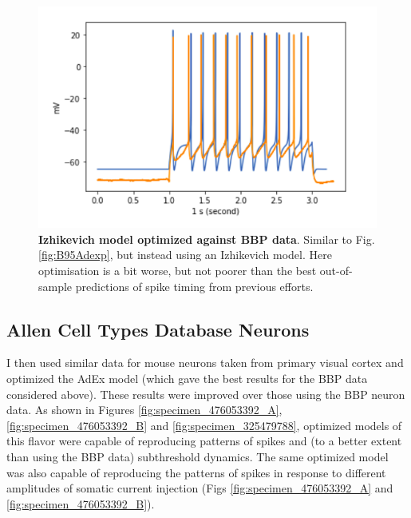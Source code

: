 \begin{figure}
    \centering
    \includegraphics{figures/IZHI_B95.png}
    \caption[Optimized Izhikevich model from BBP]{\textbf{Izhikevich model optimized against BBP data}. Similar to Fig. \ref{fig:B95Adexp}, but instead using an Izhikevich model.
    Here optimisation is a bit worse, but not poorer than the best out-of-sample predictions of spike timing from previous efforts.}
    \label{fig:B95_IZHI}
\end{figure}

\subsection{Allen Cell Types Database Neurons}
I then used similar data for mouse neurons taken from primary visual cortex and optimized the AdEx model (which gave the best results for the BBP data considered above).
These results were improved over those using the BBP neuron data.
As shown in Figures \ref{fig:specimen_476053392_A}, \ref{fig:specimen_476053392_B} and \ref{fig:specimen_325479788}, optimized models of this flavor were capable of reproducing patterns of spikes and (to a better extent than using the BBP data) subthreshold dynamics.
The same optimized model was also capable of reproducing the patterns of spikes in response to different amplitudes of somatic current injection (Figs \ref{fig:specimen_476053392_A} and \ref{fig:specimen_476053392_B}).

